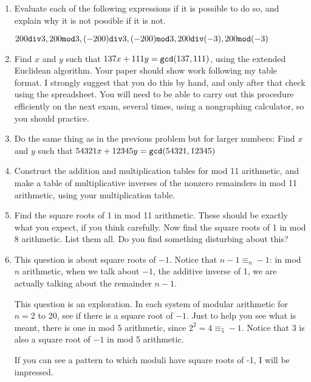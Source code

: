 \documentclass[12pt]{article}
\begin{document}
\begin{enumerate}


\item  Evaluate each of the following expressions if it is possible to do so, and explain why it is not possible if it is not.

$200{\tt div}3, 200 {\tt mod}3,  (-200){\tt div}3,  (-200) {\tt mod}3,  200{\tt div}(-3),  200 {\tt mod}(-3)$

\item  Find $x$ and $y$ such that $137x + 111y = {\tt gcd}(137,111)$, using the extended Euclidean algorithm.  Your paper should show work following my table format.  I strongly suggest that you do this by hand, and only after that check using the spreadsheet.  You will need to be able to carry out this procedure efficiently on the next exam, several times, using a nongraphing calculator, so you should practice.

\item Do the same thing as in the previous problem but for larger numbers:  Find $x$ and $y$ such that $54321x + 12345y = {\tt gcd}(54321,12345)$

\item  Construct the addition and multiplication tables for mod 11 arithmetic, and make a table of multiplicative inverses of the nonzero remainders in mod 11 arithmetic, using your multiplication table.

\item  Find the square roots of 1 in mod 11 arithmetic.  These should be exactly what you expect, if you think carefully.  Now find the square roots of 1 in mod 8 arithmetic.  List them all.  Do you find something disturbing about this?

\item  This question is about square roots of $-1$.  Notice that $n-1 \equiv_n -1$:  in mod $n$ arithmetic, when we talk about $-1$, the additive inverse of 1,  we are actually talking about the remainder $n-1$.

This question is an exploration.  In each system of modular arithmetic for $n=2$ to 20, see if there is a square root of $-1$.  Just to help you see what is meant, there is one in mod 5 arithmetic, since $2^2 = 4 \equiv_5 -1$.  Notice that 3 is also a square root of $-1$ in mod 5 arithmetic.

If you can see a pattern to which moduli have square roots of -1, I will be impressed.

\end{enumerate}
\end{document}
